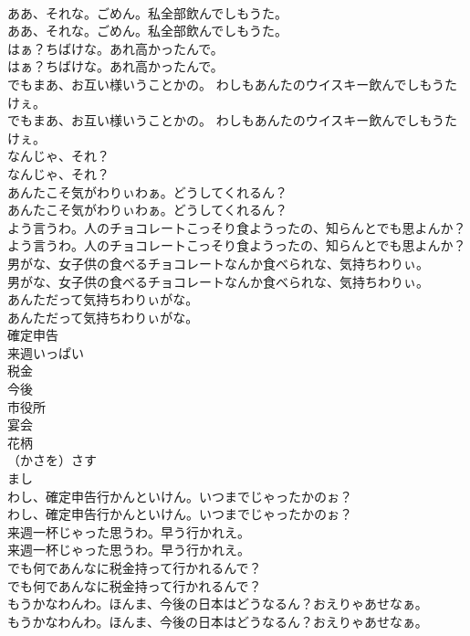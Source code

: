 \documentclass[8pt]{extreport}
\begin{document}
\begin{CJK}{UTF8}{min}
\\	ああ、それな。ごめん。私全部飲んでしもうた。	
\\	ああ、それな。ごめん。私全部飲んでしもうた。　 
\\	はぁ？ちばけな。あれ高かったんで。	
\\	はぁ？ちばけな。あれ高かったんで。 
\\	でもまあ、お互い様いうことかの。 わしもあんたのウイスキー飲んでしもうたけぇ。	
\\	でもまあ、お互い様いうことかの。 わしもあんたのウイスキー飲んでしもうたけぇ。　　 
\\	なんじゃ、それ？	
\\	なんじゃ、それ？ 
\\	あんたこそ気がわりぃわぁ。どうしてくれるん？	
\\	あんたこそ気がわりぃわぁ。どうしてくれるん？ 
\\	よう言うわ。人のチョコレートこっそり食ようったの、知らんとでも思よんか？	
\\	よう言うわ。人のチョコレートこっそり食ようったの、知らんとでも思よんか？　 
\\	男がな、女子供の食べるチョコレートなんか食べられな、気持ちわりぃ。	
\\	男がな、女子供の食べるチョコレートなんか食べられな、気持ちわりぃ。 
\\	あんただって気持ちわりぃがな。	
\\	あんただって気持ちわりぃがな。 
\\	確定申告
\\	来週いっぱい
\\	税金
\\	今後
\\	市役所
\\	宴会
\\	花柄
\\	（かさを）さす
\\	まし
\\	わし、確定申告行かんといけん。いつまでじゃったかのぉ？	
\\	わし、確定申告行かんといけん。いつまでじゃったかのぉ？ 
\\	来週一杯じゃった思うわ。早う行かれえ。	
\\	来週一杯じゃった思うわ。早う行かれえ。 
\\	でも何であんなに税金持って行かれるんで？	
\\	でも何であんなに税金持って行かれるんで？ 
\\	もうかなわんわ。ほんま、今後の日本はどうなるん？おえりゃあせなぁ。	
\\	もうかなわんわ。ほんま、今後の日本はどうなるん？おえりゃあせなぁ。 

\end{CJK}
\end{document}
